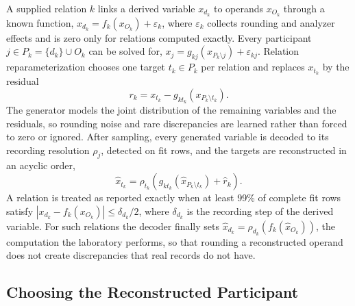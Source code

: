 \documentclass[conference]{IEEEtran}
\begin{document}
A supplied relation $k$ links a derived variable $x_{d_k}$ to operands $x_{O_k}$ through a known function, $x_{d_k} = f_k(x_{O_k}) + \varepsilon_k$, where $\varepsilon_k$ collects rounding and analyzer effects and is zero only for relations computed exactly. Every participant $j \in P_k = \{d_k\} \cup O_k$ can be solved for, $x_j = g_{kj}(x_{P_k \setminus j}) + \varepsilon_{kj}$. Relation reparameterization chooses one target $t_k \in P_k$ per relation and replaces $x_{t_k}$ by the residual
\begin{equation}
r_k = x_{t_k} - g_{k t_k}\!\left(x_{P_k \setminus t_k}\right).
\label{eq:residual}
\end{equation}
The generator models the joint distribution of the remaining variables and the residuals, so rounding noise and rare discrepancies are learned rather than forced to zero or ignored. After sampling, every generated variable is decoded to its recording resolution $\rho_j$, detected on fit rows, and the targets are reconstructed in an acyclic order,
\begin{equation}
\hat{x}_{t_k} = \rho_{t_k}\!\left( g_{k t_k}(\hat{x}_{P_k \setminus t_k}) + \hat{r}_k \right).
\label{eq:decode}
\end{equation}
A relation is treated as reported exactly when at least 99\% of complete fit rows satisfy $|x_{d_k} - f_k(x_{O_k})| \le \delta_{d_k}/2$, where $\delta_{d_k}$ is the recording step of the derived variable. For such relations the decoder finally sets $\hat{x}_{d_k} = \rho_{d_k}(f_k(\hat{x}_{O_k}))$, the computation the laboratory performs, so that rounding a reconstructed operand does not create discrepancies that real records do not have.

\subsection*{Choosing the Reconstructed Participant}
\end{document}
